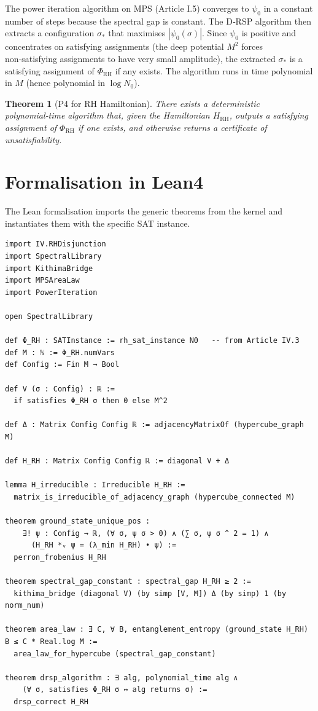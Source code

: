 \documentclass[11pt,a4paper]{article}
\newtheorem{theorem}{Theorem}[section]
\begin{document}
The power iteration algorithm on MPS (Article I.5) converges to \(\psi_0\) in a constant number of steps because the spectral gap is constant. The D‑RSP algorithm then extracts a configuration \(\sigma_{*}\) that maximises \(|\psi_0(\sigma)|\). Since \(\psi_0\) is positive and concentrates on satisfying assignments (the deep potential \(M^2\) forces non‑satisfying assignments to have very small amplitude), the extracted \(\sigma_{*}\) is a satisfying assignment of \(\Phi_{\text{RH}}\) if any exists. The algorithm runs in time polynomial in \(M\) (hence polynomial in \(\log N_0\)).

\begin{theorem}[P4 for RH Hamiltonian]
There exists a deterministic polynomial‑time algorithm that, given the Hamiltonian \(H_{\text{RH}}\), outputs a satisfying assignment of \(\Phi_{\text{RH}}\) if one exists, and otherwise returns a certificate of unsatisfiability.
\end{theorem}

\section{Formalisation in Lean4}

The Lean formalisation imports the generic theorems from the kernel and instantiates them with the specific SAT instance.

\begin{lstlisting}[style=lean, caption={SeriesIV/RHHamiltonian.lean (excerpt)}]
import IV.RHDisjunction
import SpectralLibrary
import KithimaBridge
import MPSAreaLaw
import PowerIteration

open SpectralLibrary

def Φ_RH : SATInstance := rh_sat_instance N0   -- from Article IV.3
def M : ℕ := Φ_RH.numVars
def Config := Fin M → Bool

def V (σ : Config) : ℝ :=
  if satisfies Φ_RH σ then 0 else M^2

def Δ : Matrix Config Config ℝ := adjacencyMatrixOf (hypercube_graph M)

def H_RH : Matrix Config Config ℝ := diagonal V + Δ

lemma H_irreducible : Irreducible H_RH :=
  matrix_is_irreducible_of_adjacency_graph (hypercube_connected M)

theorem ground_state_unique_pos :
    ∃! ψ : Config → ℝ, (∀ σ, ψ σ > 0) ∧ (∑ σ, ψ σ ^ 2 = 1) ∧
      (H_RH *ᵥ ψ = (λ_min H_RH) • ψ) :=
  perron_frobenius H_RH

theorem spectral_gap_constant : spectral_gap H_RH ≥ 2 :=
  kithima_bridge (diagonal V) (by simp [V, M]) Δ (by simp) 1 (by norm_num)

theorem area_law : ∃ C, ∀ B, entanglement_entropy (ground_state H_RH) B ≤ C * Real.log M :=
  area_law_for_hypercube (spectral_gap_constant)

theorem drsp_algorithm : ∃ alg, polynomial_time alg ∧
    (∀ σ, satisfies Φ_RH σ ↔ alg returns σ) :=
  drsp_correct H_RH
\end{lstlisting}
\end{document}
